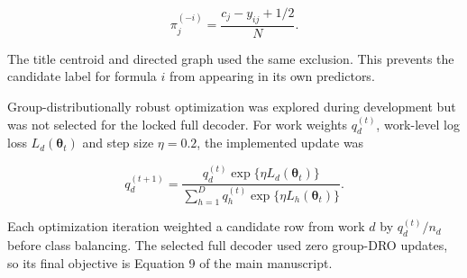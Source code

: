 \documentclass[11pt]{article}
\begin{document}
\begin{equation}
\label{eq:supp-loo-prevalence}
\pi_j^{(-i)}=\frac{c_j-y_{ij}+1/2}{N}.
\end{equation}

The title centroid and directed graph used the same exclusion. This prevents the candidate label for formula \(i\) from appearing in its own predictors.

Group-distributionally robust optimization was explored during development but was not selected for the locked full decoder. For work weights \(q_d^{(t)}\), work-level log loss \(L_d(\boldsymbol\theta_t)\) and step size \(\eta=0.2\), the implemented update was

\begin{equation}
\label{eq:supp-group-dro}
q_d^{(t+1)}=\frac{q_d^{(t)}\exp\{\eta L_d(\boldsymbol\theta_t)\}}{\sum_{h=1}^{D}q_h^{(t)}\exp\{\eta L_h(\boldsymbol\theta_t)\}}.
\end{equation}

Each optimization iteration weighted a candidate row from work \(d\) by \(q_d^{(t)}/n_d\) before class balancing. The selected full decoder used zero group-DRO updates, so its final objective is Equation 9 of the main manuscript.

\begin{landscape}
\begin{table}[p]
\centering
\scriptsize
\caption*{Supplementary Table S1}
\end{table}
\end{landscape}
\end{document}
